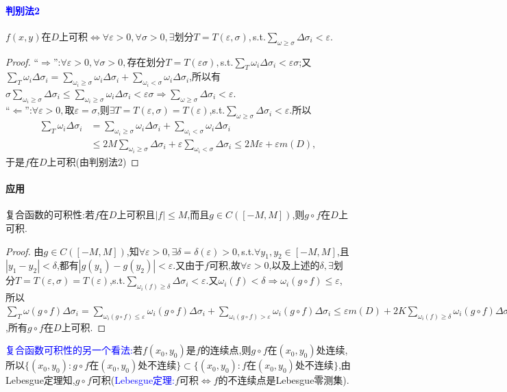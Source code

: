 \documentclass[UTF8]{ctexart}
\begin{document}
    \paragraph{\textcolor{blue}{判别法2}}
    $f(x,y)$在$D$上可积$\Leftrightarrow\forall\varepsilon>0,\forall\sigma>0,\exists$划分$T=T(\varepsilon,\sigma),$s.t.$\sum_{\omega\ge\sigma}\Delta\sigma_i<\varepsilon$.
    \begin{proof}
        ``$\Rightarrow$'':$\forall\varepsilon>0,\forall\sigma>0,$存在划分$T=T(\varepsilon\sigma),$s.t.$\sum_T\omega_i\Delta\sigma_i<\varepsilon\sigma$;又$\sum_T\omega_i\Delta\sigma_i=\sum_{\omega_i\ge\sigma}\omega_i\Delta\sigma_i+\sum_{\omega_i<\sigma}\omega_i\Delta\sigma_i$,所以有$\sigma\sum_{\omega_i\ge\sigma}\Delta\sigma_i\le \sum_{\omega_i\ge\sigma}\omega_i\Delta\sigma_i<\varepsilon\sigma\Rightarrow\sum_{\omega\ge\sigma}\Delta\sigma_i<\varepsilon$.\\
        ``$\Leftarrow$'':$\forall\varepsilon>0,$取$\varepsilon=\sigma$,则$\exists T=T(\varepsilon,\sigma)=T(\varepsilon)$,s.t.$\sum_{\omega\ge\sigma}\Delta\sigma_i<\varepsilon$.所以
        \begin{align*}
            \sum_T\omega_i\Delta\sigma_i&=\sum_{\omega_i\ge\sigma}\omega_i\Delta\sigma_i+\sum_{\omega_i<\sigma}\omega_i\Delta\sigma_i\\
            &\le 2M\sum_{\omega_i\ge\sigma}\Delta\sigma_i+\varepsilon\sum_{\omega_i<\sigma}\Delta\sigma_i\le 2M\varepsilon+\varepsilon m(D),
        \end{align*}
        于是$f$在$D$上可积(由判别法2)
    \end{proof}

    \paragraph{应用}复合函数的可积性:若$f$在$D$上可积且$|f|\le M$,而且$g\in C([-M,M])$,则$g\circ f$在$D$上可积.
    \begin{proof}
        由$g\in C([-M,M])$,知$\forall\varepsilon>0,\exists\delta=\delta(\varepsilon)>0,$s.t.$\forall y_1,y_2\in[-M,M]$,且$|y_1-y_2|<\delta$,都有$|g(y_1)-g(y_2)|<\varepsilon$.又由于$f$可积,故$\forall\varepsilon>0$,以及上述的$\delta,\exists$划分$T=T(\varepsilon,\sigma)=T(\varepsilon)$,s.t.$\sum_{\omega_i(f)\ge\delta}\Delta\sigma_i<\varepsilon$.又$\omega_i(f)<\delta\Rightarrow\omega_i(g\circ f)\le\varepsilon$,所以$\sum_T\omega(g\circ f)\Delta\sigma_i=\sum_{\omega_i(g\circ f)\le\varepsilon}\omega_i(g\circ f)\Delta\sigma_i+\sum_{\omega_i(g\circ f)>\varepsilon}\omega_i(g\circ f)\Delta\sigma_i\le\varepsilon m(D)+2K\sum_{\omega_i(f)\ge\delta}\omega_i(g\circ f)\Delta\sigma_i(K=\sup_D|g\circ f|)\le\varepsilon m(D)+2K\varepsilon$,所有$g\circ f$在$D$上可积.
    \end{proof}
    \textcolor{blue}{复合函数可积性的另一个看法:}若$f(x_0,y_0)$是$f$的连续点,则$g\circ f$在$(x_0,y_0)$处连续,所以$\{(x_0,y_0):g\circ f\text{在}(x_0,y_0)\text{处不连续}\}\subset\{(x_0,y_0):f\text{在}(x_0,y_0)\text{处不连续}\}$,由Lebesgue定理知,$g\circ f$可积(\textcolor{blue}{Lebesgue定理:}$f$可积$\Leftrightarrow f$的不连续点是Lebesgue零测集).
\end{document}
